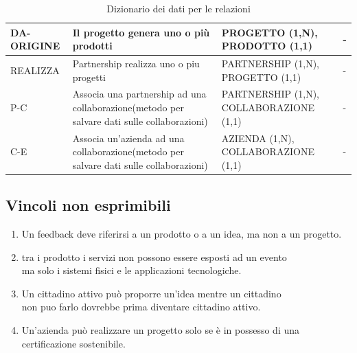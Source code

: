 \documentclass{article}
\begin{document}
\begin{table}[h!]
\begin{tabular}{|l|p{4cm}|p{6cm}|p{3cm}|}
    \hline
    DA-ORIGINE & Il progetto genera uno o più prodotti & PROGETTO (1,N), PRODOTTO (1,1) & - \\
    \hline
    REALIZZA & Partnership realizza uno o piu progetti & PARTNERSHIP (1,N), PROGETTO (1,1) & - \\
    \hline
    P-C & Associa una partnership ad una collaborazione(metodo per salvare dati sulle collaborazioni) & PARTNERSHIP (1,N), COLLABORAZIONE (1,1) & - \\
    \hline
    C-E & Associa un'azienda ad una collaborazione(metodo per salvare dati sulle collaborazioni) & AZIENDA (1,N), COLLABORAZIONE (1,1) & - \\
    \end{tabular}
    \caption{Dizionario dei dati per le relazioni}
\end{table}

\newpage
\subsection{Vincoli non esprimibili}
\begin{par}
    \begin{enumerate}
        \item Un feedback deve riferirsi a un prodotto o a un idea, ma non a un progetto. \\
        \item tra i prodotto i servizi non possono essere esposti ad un evento\\ ma solo i sistemi fisici e le applicazioni tecnologiche. \\
        \item Un cittadino attivo può proporre un'idea mentre un cittadino\\ non puo farlo dovrebbe prima diventare cittadino attivo. \\
        \item Un'azienda può realizzare un progetto solo se è in possesso di una certificazione sostenibile.\\
    \end{enumerate}
    \end{par}
\end{document}
